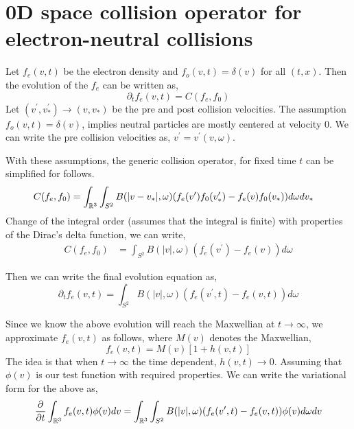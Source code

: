 \documentclass{article}
\begin{document}

\section{0D space collision operator for electron-neutral collisions}
\label{sec:electron_neutral_pc}
Let $f_e(v,t)$ be the electron density and $f_o(v,t)=\delta(v)$ for all $(t,x)$. Then the evolution of the $f_e$ can be written as, 
\begin{equation}
    \partial_t f_e(v,t) = C(f_e,f_0)
\end{equation}
Let $(v^\prime,v_*^\prime) \rightarrow (v,v_*)$ be the pre and post collision velocities. The assumption $f_o(v,t)=\delta(v)$, implies neutral particles are mostly centered at velocity $0$. We can write the pre collision velocities as, $v^\prime=v^\prime(v,\omega)$. 

With these assumptions, the generic collision operator, for fixed time $t$ can be simplified for follows. 
\begin{align}
    C(f_e,f_0) &= \int_{\mathbb{R}^3}\int_{S^2} B(|v-v_*|,\omega)(f_e(v^\prime)f_0(v_*^\prime) - f_e(v)f_0(v_*) ) d\omega dv_*
\end{align}
Change of the integral order (assumes that the integral is finite) with properties of the Dirac's delta function, we can write, 
\begin{align}
    C(f_e,f_0) &= \int_{S^2} B(|v|,\omega)(f_e(v^\prime) - f_e(v)) d\omega
\end{align}

Then we can write the final evolution equation as, 
\begin{equation}
    \partial_t f_e(v,t) = \int_{S^2} B(|v|,\omega)(f_e(v^\prime,t) - f_e(v,t)) d\omega
\end{equation}

Since we know the above evolution will reach the Maxwellian at $t\rightarrow \infty$, we approximate $f_e(v,t)$ as follows, where $M(v)$ denotes the Maxwellian, 
\begin{equation}
    f_e(v,t) = M(v)[1 + h(v,t)] \label{eq:maxwelian}
\end{equation}
The idea is that when $t\rightarrow \infty$ the time dependent, $h(v,t)\rightarrow 0$.
Assuming that $\phi(v)$ is our test function with required properties. We can write the variational form for the above as, 
\begin{equation}
    \frac{\partial}{\partial t} \int_{\mathbb{R}^3} f_e(v,t) \phi(v) dv = \int_{\mathbb{R}^3} \int_{S^2} B(|v|,\omega)(f_e(v^\prime,t) - f_e(v,t)) \phi(v) d\omega dv \label{eq:0d_wf}
\end{equation}
\end{document}
